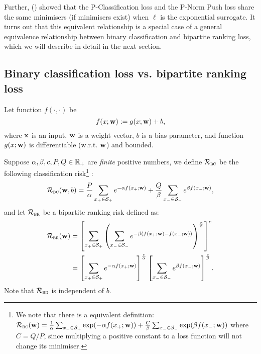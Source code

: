 Further, (\cite{ertekin2011equivalence}) showed that the P-Classification loss and the P-Norm Push loss share the same minimisers
(if minimisers exist) when $\ell$ is the exponential surrogate.
It turns out that this equivalent relationship is a special case of a general equivalence relationship 
between binary classification and bipartite ranking loss, which we will describe in detail in the next section.



\subsection{Binary classification loss vs. bipartite ranking loss}

Let function $f(\cdot, \cdot)$ be
$$
f(x; \mathbf{w}) := g(x; \mathbf{w}) + b,
$$
where $\mathbf{x}$ is an input, $\mathbf{w}$ is a weight vector, $b$ is a bias parameter, 
and function $g(x; \mathbf{w})$ is differentiable (w.r.t. $\mathbf{w}$) and bounded.

Suppose $\alpha, \beta, c, P, Q \in \mathbb{R}_+$ are \emph{finite} positive numbers, we define 
$\mathcal{R}_\textsc{bc}$ be the following classification risk\footnote{
We note that there is a equivalent definition:
$\mathcal{R}_\textsc{bc}(\mathbf{w}) = \frac{1}{\alpha} \sum_{x_+ \in \mathcal{S}_+} \exp(-\alpha f(x_+; \mathbf{w})) + 
\frac{C}{\beta} \sum_{x_- \in \mathcal{S}_-} \exp( \beta f(x_-; \mathbf{w}))$
where $C = Q/P$, since multiplying a positive constant to a loss function will not change its minimiser.}
:
\begin{equation*}
\mathcal{R}_\textsc{bc}(\mathbf{w}, b)
= \displaystyle 
  \frac{P}{\alpha} \sum_{x_+ \in \mathcal{S}_+} e^{-\alpha f(x_+; \mathbf{w})} +
  \frac{Q}{\beta}  \sum_{x_- \in \mathcal{S}_-} e^{ \beta  f(x_-; \mathbf{w})},
\end{equation*}
and let
$\mathcal{R}_\textsc{br}$ be a bipartite ranking risk defined as:
\begin{equation*}
\begin{aligned}
\mathcal{R}_\textsc{br}(\mathbf{w})
&= \left[ \displaystyle 
   \sum_{x_+ \in \mathcal{S}_+} \left( \sum_{x_- \in \mathcal{S}_-} e^{-\beta (f(x_+; \mathbf{w}) - f(x_-; \mathbf{w}))} \right)^\frac{\alpha}{\beta} 
   \right]^c \\
&= \left[ \sum_{x_+ \in \mathcal{S}_+} e^{-\alpha f(x_+; \mathbf{w})} \right]^\frac{c}{\alpha}
   \left[ \sum_{x_- \in \mathcal{S}_-} e^{ \beta  f(x_-; \mathbf{w})} \right]^\frac{c}{\beta}.
\end{aligned}
\end{equation*}
Note that $\mathcal{R}_\textsc{br}$ is independent of $b$.


